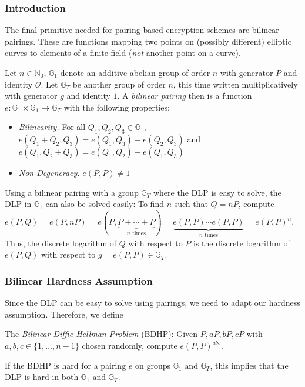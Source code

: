 \subsubsection{Introduction}
The final primitive needed for pairing-based encryption schemes are bilinear pairings. These are functions mapping two points on (possibly different) elliptic curves to elements of a finite field (\emph{not} another point on a curve).\cite{blake_advances_2005}

Let $n \in \mathbb{N}_0$, $\mathbb{G}_1$ denote an additive abelian group of order $n$ with generator $P$ and identity $\mathcal{O}$. 
Let $\mathbb{G}_T$ be another group of order $n$, this time written multiplicatively with generator $g$ and identity $1$.
A \emph{bilinear pairing} then is a function $e: \mathbb{G}_1 \times \mathbb{G}_1 \rightarrow \mathbb{G}_T$ with the following properties:
\begin{itemize}
    \item \emph{Bilinearity.} For all $Q_1, Q_2, Q_3 \in \mathbb{G}_1$, $e(Q_1+Q_2, Q_3) = e(Q_1,Q_3)+e(Q_2,Q_3)$ and $e(Q_1, Q_2+Q_3)=e(Q_1,Q_2)+e(Q_1,Q_3)$
    \item \emph{Non-Degeneracy.} $e(P,P) \neq 1$
\end{itemize}

Using a bilinear pairing with a group $\mathbb{G}_T$ where the DLP is easy to solve, the DLP in $\mathbb{G}_1$ can also be solved easily:
To find $n$ such that $Q = nP$, compute $e(P,Q) = e(P, nP) = e(P, \underbrace{P+\cdots+P}_{n \text{ times}}) = \underbrace{e(P,P) \cdots e(P,P)}_{n \text{ times}} = e(P,P)^n$.
Thus, the discrete logarithm of $Q$ with respect to $P$ is the discrete logarithm of $e(P,Q)$ with respect to $g = e(P,P) \in \mathbb{G}_T$.~\cite{menezes_introduction_2009}

\subsubsection{Bilinear Hardness Assumption}

Since the DLP can be easy to solve using pairings, we need to adapt our hardness assumption. Therefore, we define

The \emph{Bilinear Diffie-Hellman Problem} (BDHP): Given $P, aP, bP, cP$ with $a,b,c \in \{1,\dots,n-1\}$ chosen randomly, compute $e(P, P)^{abc}$.~\cite{menezes_introduction_2009}

If the BDHP is hard for a pairing $e$ on groups $\mathbb{G}_1 \text{ and } \mathbb{G}_T$, this implies that the DLP is hard in both $\mathbb{G}_1 \text{ and } \mathbb{G}_T$.~\cite{menezes_introduction_2009}